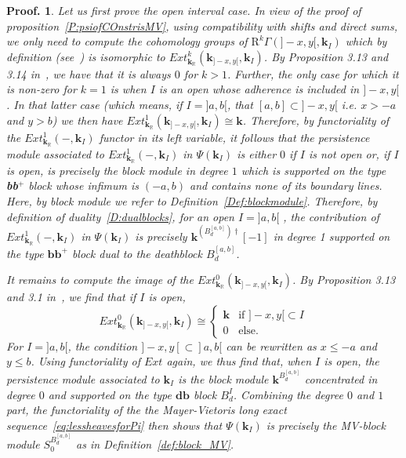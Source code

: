 \documentclass[a4paper, english, 11pt]{article}
\newcommand{\kk}[0]{\textbf{k}}
\newcommand{\0}{\vec{0}}
\newcommand{\R}[0]{\mathbb{R}}
\newcommand{\Rr}[0]{\text{R}}
\newtheorem*{pf}{Proof.} }
\begin{document}
\begin{pf}Let us first prove the open interval case.
In view of the proof of proposition~\ref{P:psiofCOnstrisMV}, using compatibility with shifts and direct sums, we only need to compute the cohomology groups of $\Rr^k\Gamma \left ( ]-x,y[ , \kk_{I}\right )$ which by definition (see~\cite{Kash90}) is isomorphic to 
$Ext^k_{\kk_\R}\left( \kk_{]-x,y[}, \kk_{I }\right) $. 
By Proposition 3.13 and 3.14 in~\cite{Berk18}, we have that it is always $0$ for $k>1$. Further, the only case for which it is non-zero for $k=1$ is when $I$ is an open whose adherence is included in $]-x,y[$. In that latter case (which means, if $I=]a,b[$, that $[a,b]\subset ]-x,y[$ i.e. $x>-a$ and $y>b$) we  then have $Ext^1_{\kk_\R}\left( \kk_{]-x,y[}, \kk_{I }\right) \cong \kk $.  Therefore, by functoriality of the $Ext^1_{\kk_\R}( -, \kk_I)$ functor in its left variable, it follows that the persistence module associated to  
$Ext^1_{\kk_\R}( -, \kk_I)$ in $\Psi(\kk_I)$ is either $0$ if $I$ is not open or, if $I$ is open, is precisely the block module in degree $1$ which is supported on the type \textbf{bb}$^+$ block whose infimum is $(-a,b)$ and contains none of its boundary lines. Here, by block module we refer to Definition~\ref{Def:blockmodule}. Therefore, by definition of duality~\ref{D:dualblocks}, for an open $I=]a,b[$ , the contribution of $Ext^1_{\kk_\R}( -, \kk_I)$ in $\Psi(\kk_I)$ is precisely 
$\kk^{(B_d^{[a,b]})\dag}[-1]$ in degree 1 supported on the type $\textbf{bb}^{+}$ block dual to the deathblock $B_d^{[a,b]}$. 

It remains to compute the image of the $Ext^0_{\kk_\R}\left( \kk_{]-x,y[}, \kk_{I }\right) $. By Proposition 3.13 and 3.1 in~\cite{Berk18}, we find that if $I$ is open, 
$$Ext^0_{\kk_\R}\left( \kk_{]-x,y[}, \kk_{I }\right) \cong \left \{ \begin{array}{ll}
\kk & \mbox{if } ]-x, y[ \subset I \\ 0 & \mbox{else. }
\end{array}\right .$$
For $I=]a,b[$, the condition $]-x,y[ \subset ]a,b[$ can be rewritten as $x\leq -a$ and $y\leq b$.
Using functoriality of $Ext$ again, we thus find that, when $I$ is open, the persistence module associated to $\kk_I$ is the block module $ \kk^{B_d^{[a,b]}}$ concentrated in degree $0$ and supported on the type $\textbf{db}$ block $B_d^I$. Combining the degree $0$ and $1$ part, 
the functoriality of the the Mayer-Vietoris long exact sequence~\eqref{eq:lessheavesforPi} then shows that $\Psi(\kk_I) $ is precisely the MV-block module $S_0^{B_d^{[a,b]}}$ as in Definition~\ref{def:block_MV}.


\end{pf}
\end{document}
